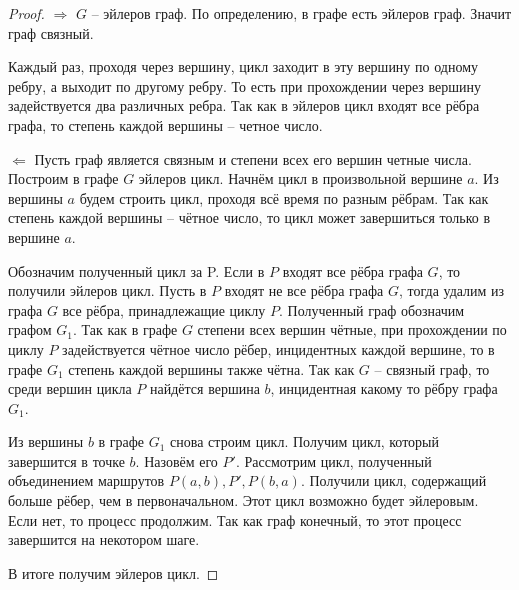 \begin{proof}
    $\Rightarrow$ $G$ -- эйлеров граф. По определению, в графе есть эйлеров граф.
    Значит граф связный.

    Каждый раз, проходя через вершину, цикл заходит в эту вершину по одному
    ребру, а выходит по другому ребру. То есть при прохождении через вершину
    задействуется два различных ребра. Так как в эйлеров цикл входят все рёбра
    графа, то степень каждой вершины -- четное число.

    $\Leftarrow$ Пусть граф является связным и степени всех его вершин четные числа.
    Построим в графе $G$ эйлеров цикл. Начнём цикл в произвольной вершине $a$.
    Из вершины $a$ будем строить цикл, проходя всё время по разным рёбрам. Так
    как степень каждой вершины -- чётное число, то цикл может завершиться
    только в вершине $a$.

    Обозначим полученный цикл за P. Если в $P$ входят все рёбра графа $G$, то получили
    эйлеров цикл. Пусть в $P$ входят не все рёбра графа $G$, тогда удалим из графа $G$ все рёбра,
    принадлежащие циклу $P$. Полученный граф обозначим графом $G_1$. Так как в
    графе $G$ степени всех вершин чётные, при прохождении по циклу $P$
    задействуется чётное число рёбер, инцидентных каждой вершине, то в графе $G_1$
    степень каждой вершины также чётна.
    Так как $G$ -- связный граф, то среди вершин цикла $P$ найдётся вершина $b$,
    инцидентная какому то рёбру графа $G_1$.

    Из вершины $b$ в графе $G_1$ снова строим цикл. Получим цикл, который
    завершится в точке $b$. Назовём его ${P}'$. Рассмотрим цикл, полученный
    объединением маршрутов $P(a,b), {P}', P(b,a)$. Получили цикл, содержащий
    больше рёбер, чем в первоначальном. Этот цикл возможно будет эйлеровым.
    Если нет, то процесс продолжим.
    Так как граф конечный, то этот процесс завершится на некотором шаге.
    
    В итоге получим эйлеров цикл.
\end{proof}